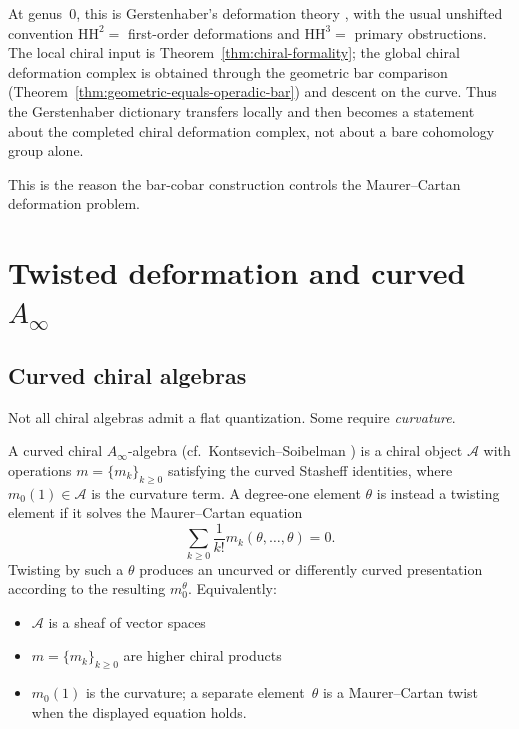 \begin{remark}[Provenance]\label{rem:master-identity-scope}
At genus~$0$, this is Gerstenhaber's deformation theory
\cite{Ger64}, with the usual unshifted convention
$\mathrm{HH}^2=$ first-order deformations and
$\mathrm{HH}^3=$ primary obstructions. The local chiral input is
Theorem~\ref{thm:chiral-formality}; the global chiral deformation
complex is obtained through the geometric bar comparison
(Theorem~\ref{thm:geometric-equals-operadic-bar}) and descent on the
curve. Thus the Gerstenhaber dictionary transfers locally and then
becomes a statement about the completed chiral deformation complex, not
about a bare cohomology group alone.
\end{remark}

This is the reason the bar-cobar construction controls the
Maurer--Cartan deformation problem.

\section{\texorpdfstring{Twisted deformation and curved $A_\infty$}{Twisted deformation and curved A-}}

\subsection{Curved chiral algebras}

Not all chiral algebras admit a flat quantization. Some require \emph{curvature}.

\begin{definition}
A curved chiral \(A_\infty\)-algebra
(cf.\ Kontsevich--Soibelman \cite{KontsevichSoibelman}) is a chiral
object \(\mathcal A\) with operations \(m=\{m_k\}_{k\geq0}\)
satisfying the curved Stasheff identities, where \(m_0(1)\in\mathcal A\)
is the curvature term. A degree-one element \(\theta\) is instead a
twisting element if it solves the Maurer--Cartan equation
\[
\sum_{k\geq0}\frac1{k!}m_k(\theta,\ldots,\theta)=0.
\]
Twisting by such a \(\theta\) produces an uncurved or differently
curved presentation according to the resulting \(m_0^\theta\).
Equivalently:
\begin{itemize}
\item $\mathcal{A}$ is a sheaf of vector spaces
\item $m = \{m_k\}_{k \geq 0}$ are higher chiral products
\item $m_0(1)$ is the curvature; a separate element~$\theta$ is a
 Maurer--Cartan twist when the displayed equation holds.
\end{itemize}
\end{definition}

